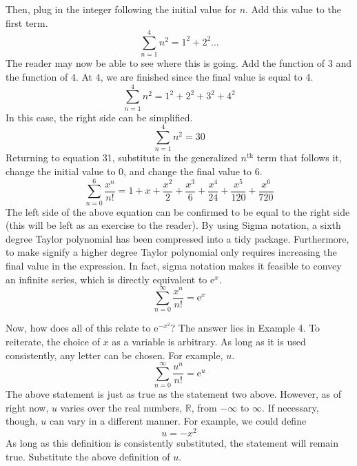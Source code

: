 \documentclass{article}
\newcounter{example}%
\begin{document}
Then, plug in the integer following the initial value for $n$. Add this value to the first term.
\begin{equation*}
    \sum_{n=1}^4 n^2 = 1^2+2^2\ldots
\end{equation*}
The reader may now be able to see where this is going. Add the function of $3$ and the function of $4$. At $4$, we are finished since the final value is equal to $4$.
\begin{equation*}
    \sum_{n=1}^4 n^2 = 1^2+2^2+3^2+4^2
\end{equation*}
In this case, the right side can be simplified.
\begin{equation*}
    \sum_{n=1}^4 n^2 = 30
\end{equation*}
Returning to equation 31, substitute in the generalized $n^\text{th}$ term that follows it, change the initial value to 0, and change the final value to 6. 
\begin{equation*}
    \sum_{n=0}^6 \frac{x^n}{n!} = 1+x+\frac{x^2}{2}+\frac{x^3}{6}+\frac{x^4}{24}+\frac{x^5}{120}+\frac{x^6}{720}
\end{equation*}
The left side of the above equation can be confirmed to be equal to the right side (this will be left as an exercise to the reader). By using Sigma notation, a sixth degree Taylor polynomial has been compressed into a tidy package. Furthermore, to make signify a higher degree Taylor polynomial only requires increasing the final value in the expression. In fact, sigma notation makes it feasible to convey an infinite series, which is directly equivalent to $\text{e}^x$.
\begin{equation*}
    \sum_{n=0}^\infty \frac{x^n}{n!} = \text{e}^x
\end{equation*}\par
\bigskip
Now, how does all of this relate to $\text{e}^{-x^2}$? The answer lies in Example 4. To reiterate, the choice of $x$ as a variable is arbitrary. As long as it is used consistently, any letter can be chosen. For example, $u$.
\begin{equation*}
    \sum_{n=0}^\infty \frac{u^n}{n!} = \text{e}^u
\end{equation*}
The above statement is just as true as the statement two above. However, as of right now, $u$ varies over the real numbers, $\mathbb{R}$, from $-\infty$ to $\infty$. If necessary, though, $u$ can vary in a different manner. For example, we could define$$u=-x^2$$As long as this definition is consistently substituted, the statement will remain true. Substitute the above definition of $u$.
\end{document}

